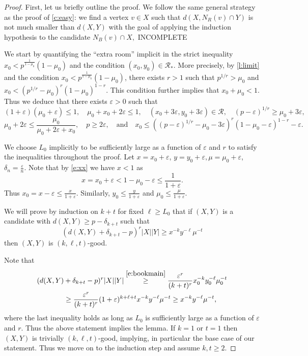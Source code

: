 \documentclass[reqno,final,12pt]{amsart}
\newcommand{\eps}{\varepsilon}
\newcommand{\mc}[1]{\mathcal{#1}}
\begin{document}
\begin{proof} First, let us briefly outline the proof. We follow the same general strategy as the proof of \cref{c:easy}: we  find a vertex $v \in X$ such that $d(X, N_R(v) \cap Y)$ is not much smaller than $d(X,Y)$ with the goal of applying the induction hypothesis to the candidate $N_B(v) \cap X, $ INCOMPLETE
	
	
We start by quantifying the ``extra room'' implicit in the strict inequality $x_0 < p^{\frac{1}{1-\mu_0}}(1-\mu_0)$ and the condition $(x_0,y_0) \in \mc{R_*}$. More precisely, by \cref{l:limit}  and the condition $x_0 < p^{\frac{1}{1-\mu_0}}(1-\mu_0)$, there exists $r>1$ such that $p^{1/r} > \mu_0$ and $x_0  <  (p^{1/r} -  \mu_0)^{r}(1-\mu_0)^{1-r}$. This condition further implies that  $x_0+\mu_0<1$. Thus we deduce that   there exists  $\eps > 0$ such that $$ (1+\eps)(\mu_0+\eps) \leq 1, \quad \mu_0+x_0+2\eps \leq 1, \quad (x_0+3\eps, y_0 +3\eps) \in \mc{R}, \quad (p-\eps)^{1/r}  \geq  \mu_0 +3\eps,  $$
 \begin{equation}\label{e:xx} \mu_0 + 2\eps \leq \frac{\mu_0}{\mu_0 + 2\eps +x_0},   \quad  p \geq 2\eps, \quad \mathrm{and} \quad x_0  \leq  ((p-\eps)^{1/r} -  \mu_0-3\eps)^{r}(1-\mu_0-\eps)^{1-r} -\eps.\end{equation} 

We choose $L_0$ implicitly to be sufficiently large as a function of $\eps$ and $r$ to satisfy the  inequalities throughout the proof.
 Let $x=x_0 +\eps$, $y=y_0+\eps, \mu = \mu_0+\eps$,	$\delta_{n}=\frac{\eps}{n}$. Note that by \eqref{e:xx} we have $x <1$ as  $$ x = x_0 + \eps < 1- \mu_0 - \eps \leq \frac{1}{1+\eps}.$$ Thus $x_0 = x-\eps \leq \frac{x}{1+\eps}$. Similarly, $y_0  \leq \frac{y}{1+\eps}$ and  $\mu_0 \leq \frac{\mu}{1+\eps}$. 
 
We will prove by induction on $k+ t$ for fixed $\ell \geq L_0$  that if $(X,Y)$ is a candidate with $d(X,Y) \geq p -\delta_{k+t}$ such that \begin{equation}\label{e:moment}
	(d(X,Y) + \delta_{k+t} - p)^r |X||Y| \geq x^{-k}y^{-\ell}\mu^{-t }
\end{equation}  then 
$(X,Y)$ is $(k,\ell,t)$-good. 

Note that
\begin{align*} (d(X,Y) &+ \delta_{k+t} - p)^r |X||Y| \stackrel{\eqref{e:bookmain}}{\geq} 
	 \frac{\eps^r}{(k+t)^r}x_0^{-k}y_0^{-\ell}\mu_0^{-t } \notag\\ &\geq \frac{\eps^r}{(k+t)^r}(1+\eps)^{k+\ell+t} x^{-k}y^{-\ell}\mu^{-t } \geq x^{-k}y^{-\ell}\mu^{-t },%
\end{align*}
where the last inequality holds as long as $L_0$ is sufficiently large as a function of $\eps$ and $r$.
Thus the above statement implies the lemma. 
If $k=1$ or $t=1$ then $(X,Y)$ is trivially $(k,\ell,t)$-good, implying, in particular the base case of our statement. Thus we move on to the induction step and assume $k,t \geq 2$.
 

\end{proof}
\end{document}
